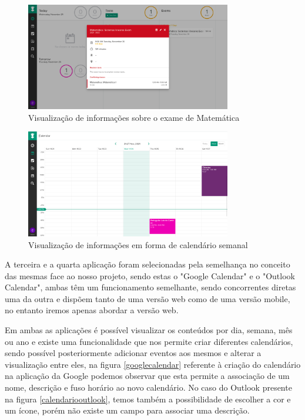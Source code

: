\documentclass[11pt, twoside]{report}
\begin{document}
	\begin{figure}[H] 
		\centering 
		\includegraphics[width=0.8\textwidth,height=0.8\textheight,keepaspectratio]{image/estadodearte/informacoesexame}
		\caption{Visualização de informações sobre o exame de Matemática}
		\label{examematematica}
	\end{figure}
	
	\begin{figure}[H] 
		\centering 
		\includegraphics[width=0.8\textwidth,height=0.8\textheight,keepaspectratio]{image/estadodearte/calendariostudy}
		\caption{Visualização de informações em forma de calendário semanal}
		\label{calendariostudylife}
	\end{figure}
	
	A terceira e a quarta aplicação foram selecionadas pela semelhança no conceito das mesmas face ao nosso projeto, sendo estas o "Google Calendar" e o "Outlook Calendar", ambas têm um funcionamento semelhante, sendo concorrentes diretas uma da outra e dispõem tanto de uma versão web como de uma versão mobile, no entanto iremos apenas abordar a versão web.
	
	Em ambas as aplicações é possível visualizar os conteúdos por dia, semana, mês ou ano e existe uma funcionalidade que nos permite criar diferentes calendários, sendo possível posteriormente adicionar eventos aos mesmos e alterar a visualização entre eles, na figura \ref{googlecalendar} referente à criação do calendário na aplicação da Google podemos observar que esta permite a associação de um nome, descrição e fuso horário ao novo calendário. No caso do Outlook presente na figura \ref{calendariooutlook}, temos também a possibilidade de escolher a cor e um ícone, porém não existe um campo para associar uma descrição.
	
\end{document}
